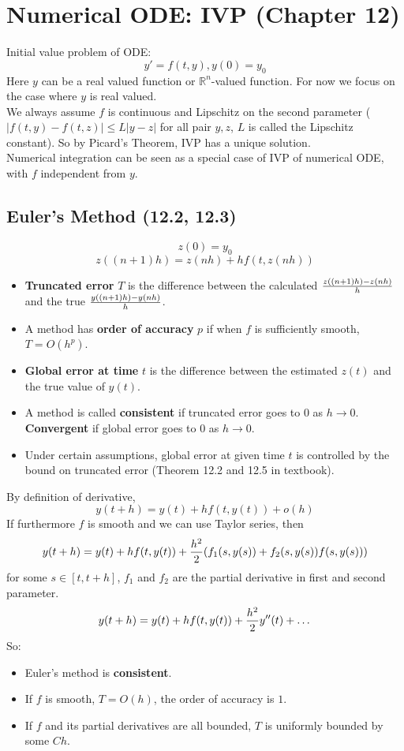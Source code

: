 \documentclass[20pt]{article} %
\theoremstyle{break}
\begin{document}
\newpage

\section{Numerical ODE: IVP (Chapter 12)}

Initial value problem of ODE:
\[y'=f(t, y), y(0)=y_0\]
Here $y$ can be a real valued function or $\mathbb{R}^n$-valued function. For now we focus on the case where $y$ is real valued.\\

We always assume $f$ is continuous and Lipschitz on the second parameter ($|f(t, y)-f(t, z)|\leq L|y-z|$ for all pair $y, z$, $L$ is called the Lipschitz constant). So by Picard's Theorem, IVP has a unique solution.\\

Numerical integration can be seen as a special case of IVP of numerical ODE, with $f$ independent from $y$.\\

\newpage

\subsection{Euler's Method (12.2, 12.3)}

\[z(0)=y_0\]
\[z((n+1)h)=z(nh)+hf(t, z(nh))\]

\begin{itemize}
\item {\bf Truncated error} $T$ is the difference between the calculated $z((n+1)h)-z(nh)\over h$ and the true $y((n+1)h)-y(nh)\over h$. 
\item A method has {\bf order of accuracy} $p$ if when $f$ is sufficiently smooth, $T=O(h^p)$.
\item {\bf Global error at time} $t$ is the difference between the estimated $z(t)$ and the true value of $y(t)$.
\item A method is called {\bf consistent} if truncated error goes to $0$ as $h\rightarrow 0$. {\bf Convergent} if global error goes to $0$ as $h\rightarrow 0$.
\item Under certain assumptions, global error at given time $t$ is controlled by the bound on truncated error (Theorem 12.2 and 12.5 in textbook).
\end{itemize}

\newpage

By definition of derivative,
\[y(t+h)=y(t)+hf(t, y(t))+o(h)\]
If furthermore $f$ is smooth and we can use Taylor series, then
\[y(t+h)=y(t)+hf(t, y(t))+{h^2\over 2}(f_1(s, y(s))+f_2(s, y(s))f(s, y(s)))\]
for some $s\in [t, t+h]$, $f_1$ and $f_2$ are the partial derivative in first and second parameter. 
\[y(t+h)=y(t)+hf(t, y(t))+{h^2\over 2}y''(t)+\dots\]
So:
\begin{itemize}
\item Euler's method is {\bf consistent}.
\item If $f$ is smooth,  $T=O(h)$, the order of accuracy is $1$.
\item If $f$ and its partial derivatives are all bounded, $T$ is uniformly bounded by some $Ch$.
\end{itemize}
\end{document}
